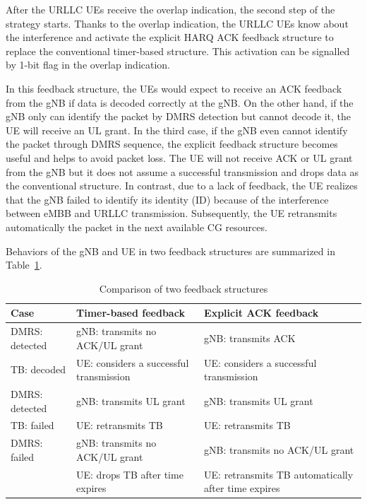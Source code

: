 \documentclass{ieeeaccess}
\begin{document}
After the URLLC UEs receive the overlap indication, the second step of the strategy starts. Thanks to the overlap indication, the URLLC UEs know about the interference and activate the explicit HARQ ACK feedback structure to replace the conventional timer-based structure. This activation can be signalled by 1-bit flag in the overlap indication. 

In this feedback structure, the UEs would expect to receive an ACK feedback from the gNB if data is decoded correctly at the gNB. On the other hand, if the gNB only can identify the packet by DMRS detection but cannot decode it, the UE will receive an UL grant. In the third case, if the gNB even cannot identify the packet through DMRS sequence, the explicit feedback structure becomes useful and helps to avoid packet loss. The UE will not receive ACK or UL grant from the gNB but it does not assume a successful transmission and drops data as the conventional structure. In contrast, due to a lack of feedback, the UE realizes that the gNB failed to identify its identity (ID) because of the interference between eMBB and URLLC transmission. Subsequently, the UE retransmits automatically the packet in the next available CG resources. 

Behaviors of the gNB and UE in two feedback structures are summarized in Table~\ref{tab1}.

\begin{table}[htbp]
\caption{Comparison of two feedback structures}
\begin{center}
\begin{tabular}{|p{8em}|p{8em}|p{8em}|}
 \hline
 \textbf{Case} & \textbf{Timer-based feedback}&\textbf{Explicit ACK feedback}\\
 \hline
 DMRS: detected&gNB: transmits no ACK/UL grant&gNB: transmits ACK\\TB: decoded &UE: considers a successful transmission &UE: considers a successful transmission\\
 \hline
  DMRS: detected&gNB: transmits UL grant &gNB: transmits UL grant\\TB: failed & UE: retransmits TB&UE: retransmits TB\\
 \hline
DMRS: failed&gNB: transmits no ACK/UL grant&gNB: transmits no ACK/UL grant\\ &UE: drops TB after time expires& UE: retransmits TB automatically after time expires\\

 
 \hline
\end{tabular}
\label{tab1}
\end{center}
\vspace{-5mm}
\end{table}
\end{document}
